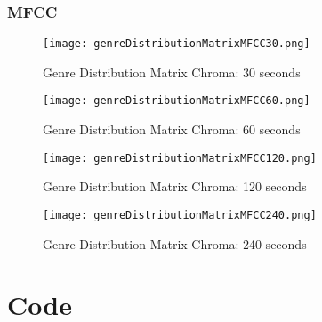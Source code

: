 \documentclass{article} %
\begin{document}
\subsubsection{MFCC}
\begin{figure}[H]
\centering
\texttt{[image: genreDistributionMatrixMFCC30.png]}
\caption{Genre Distribution Matrix Chroma: 30 seconds}
\end{figure}

\begin{figure}[H]
\centering
\texttt{[image: genreDistributionMatrixMFCC60.png]}
\caption{Genre Distribution Matrix Chroma: 60 seconds}
\end{figure}

\begin{figure}[H]
\centering
\texttt{[image: genreDistributionMatrixMFCC120.png]}
\caption{Genre Distribution Matrix Chroma: 120 seconds}
\end{figure}

\begin{figure}[H]
\centering
\texttt{[image: genreDistributionMatrixMFCC240.png]}
\caption{Genre Distribution Matrix Chroma: 240 seconds}
\end{figure}






\clearpage
\section{Code}

 
 
 
 
 
 
 
 
 

 
 
 
 
 
 
 
 
\end{document}
